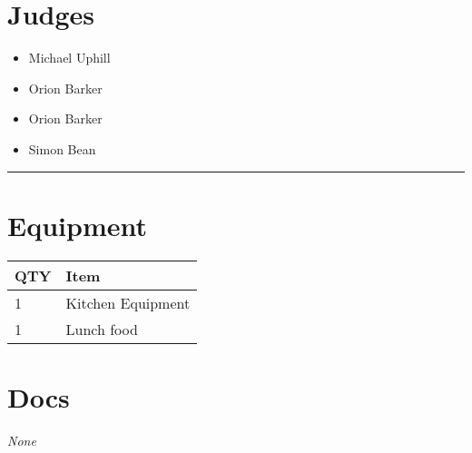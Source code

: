 \documentclass[10pt]{article}
\begin{document}
		\section*{\faUsers \: Judges}

		

	\begin{multicols}{2}

		\begin{itemize}
									\item Michael Uphill
									\item Orion Barker
						\end{itemize}

		\vfill\null
		\columnbreak

		\begin{itemize}
									\item Orion Barker
									\item Simon Bean
						\end{itemize}

		\vfill\null

		\end{multicols}



			\vspace{0.5cm}
	\hrule
	\vspace{0.5cm}

	\begin{multicols}{2}

		\section*{\faWrench \: Equipment}

		
	\begin{center}
			\begin{tabular}{p{2cm}p{4cm}}


				\textbf{QTY} & \textbf{Item} \\\toprule
												1&Kitchen Equipment\\\midrule
												1&Lunch food\\\midrule
								\end{tabular}

			\end{center}

		
		\vfill\null
		\columnbreak

			\section*{\faFile \: Docs}
		 	\textit{None}
	

		\vfill\null

		\end{multicols}
\end{document}
